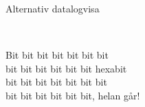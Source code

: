 \begin{song}{Alternativ datalogvisa}
	
	
	\\
	
	
	Bit bit bit bit bit bit bit\\
	bit bit bit bit bit bit hexabit\\
	bit bit bit bit bit bit bit\\
	bit bit bit bit bit bit, helan går!
	
\end{song}
